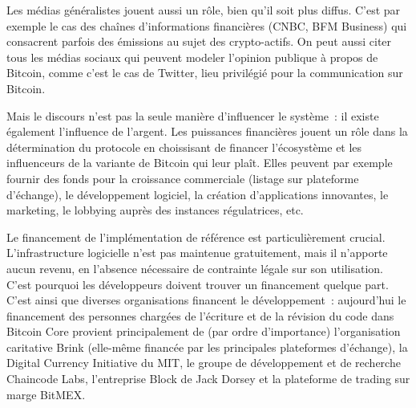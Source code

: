 Les médias généralistes jouent aussi un rôle, bien qu'il soit plus diffus. C'est par exemple le cas des chaînes d'informations financières (CNBC, BFM Business) qui consacrent parfois des émissions au sujet des crypto-actifs. On peut aussi citer tous les médias sociaux qui peuvent modeler l'opinion publique à propos de Bitcoin, comme c'est le cas de Twitter, lieu privilégié pour la communication sur Bitcoin.


Mais le discours n'est pas la seule manière d'influencer le système~: il existe également l'influence de l'argent. Les puissances financières jouent un rôle dans la détermination du protocole en choissisant de financer l'écosystème et les influenceurs de la variante de Bitcoin qui leur plaît. Elles peuvent par exemple fournir des fonds pour la croissance commerciale (listage sur plateforme d'échange), le développement logiciel, la création d'applications innovantes, le marketing, le lobbying auprès des instances régulatrices, etc.

Le financement de l'implémentation de référence est particulièrement crucial. L'infrastructure logicielle n'est pas maintenue gratuitement, mais il n'apporte aucun revenu, en l'absence nécessaire de contrainte légale sur son utilisation. C'est pourquoi les développeurs doivent trouver un financement quelque part. C'est ainsi que diverses organisations financent le développement~: aujourd'hui le financement des personnes chargées de l'écriture et de la révision du code dans Bitcoin Core provient principalement de (par ordre d'importance) l'organisation caritative Brink (elle-même financée par les principales plateformes d'échange), la Digital Currency Initiative du MIT, le groupe de développement et de recherche Chaincode Labs, l'entreprise Block de Jack Dorsey et la plateforme de trading sur marge BitMEX.

